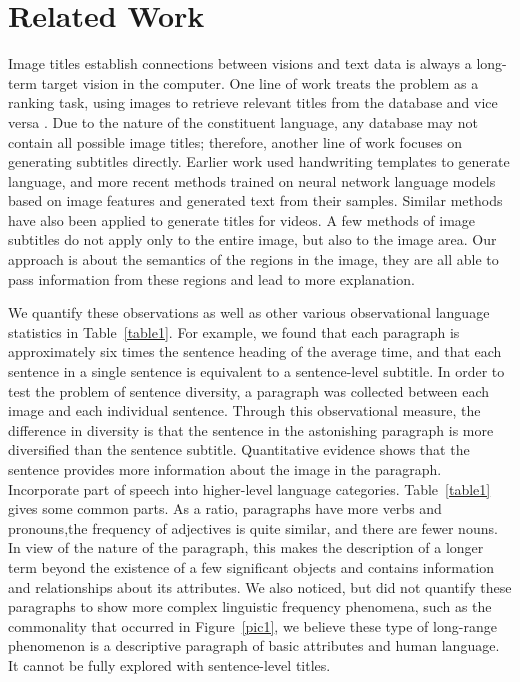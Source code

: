 \documentclass[10pt,twocolumn,letterpaper]{article}
\begin{document}
\section{Related Work}
Image titles establish connections between visions and text data is always a long-term target vision in the computer. One line of work treats the problem as a ranking task, using images to retrieve relevant titles from the database and vice versa \cite{Karpathy_2014_Deep}. Due to the nature of the constituent language, any database may not contain all possible image titles; therefore, another line of work focuses on generating subtitles directly. Earlier work used handwriting templates to generate language\cite{Kulkarni_2011_Baby}, and more recent methods trained on neural network language models based on image features\cite{Chen_2015_Mind} and generated text from their samples. Similar methods have also been applied to generate titles for videos\cite{Yu_2016_Video}. A few methods of image subtitles do not apply only to the entire image, but also to the image area. Our approach is about the semantics of the regions in the image, they are all able to pass information from these regions and lead to more explanation.
\par  We quantify these observations as well as other various observational language statistics in Table~\ref{table1}. For example, we found that each paragraph is approximately six times the sentence heading of the average time, and that each sentence in a single sentence is equivalent to a sentence-level subtitle. In order to test the problem of sentence diversity, a paragraph was collected between each image and each individual sentence. Through this observational measure, the difference in diversity is that the sentence in the astonishing paragraph is more diversified than the sentence subtitle. Quantitative evidence shows that the sentence provides more information about the image in the paragraph. Incorporate part of speech into higher-level language categories. Table~\ref{table1} gives some common parts. As a ratio, paragraphs have more verbs and pronouns,the frequency of adjectives is quite similar, and there are fewer nouns. In view of the nature of the paragraph, this makes the description of a longer term beyond the existence of a few significant objects and contains information and relationships about its attributes. We also noticed, but did not quantify these paragraphs to show more complex linguistic frequency phenomena, such as the commonality that occurred in Figure~\ref{pic1}, we believe these type of long-range phenomenon is a descriptive paragraph of basic attributes and human language. It cannot be fully explored with sentence-level titles.
\end{document}
